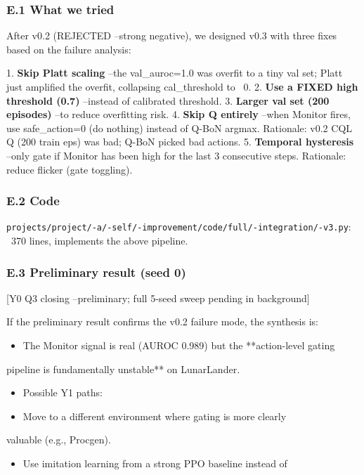 \documentclass[11pt]{article}
\begin{document}
\subsubsection{E.1 What we tried}

After v0.2 (REJECTED --strong negative), we designed v0.3 with three fixes
based on the failure analysis:

1. \textbf{Skip Platt scaling} --the val\_auroc=1.0 was overfit to a tiny val set;
   Platt just amplified the overfit, collapsing cal\_threshold to ~0.
2. \textbf{Use a FIXED high threshold (0.7)} --instead of calibrated threshold.
3. \textbf{Larger val set (200 episodes)} --to reduce overfitting risk.
4. \textbf{Skip Q entirely} --when Monitor fires, use safe\_action=0 (do nothing)
   instead of Q-BoN argmax. Rationale: v0.2 CQL Q (200 train eps) was bad;
   Q-BoN picked bad actions.
5. \textbf{Temporal hysteresis} --only gate if Monitor has been high for the
   last 3 consecutive steps. Rationale: reduce flicker (gate toggling).

\subsubsection{E.2 Code}

\texttt{projects/project/-a/-self/-improvement/code/full/-integration/-v3.py}:
~370 lines, implements the above pipeline.

\subsubsection{E.3 Preliminary result (seed 0)}

[Y0 Q3 closing --preliminary; full 5-seed sweep pending in background]

If the preliminary result confirms the v0.2 failure mode, the synthesis is:

\begin{itemize}
  \item The Monitor signal is real (AUROC 0.989) but the **action-level gating
\end{itemize}

  pipeline is fundamentally unstable** on LunarLander.
\begin{itemize}
  \item Possible Y1 paths:
  \item Move to a different environment where gating is more clearly
\end{itemize}

    valuable (e.g., Procgen).
\begin{itemize}
  \item Use imitation learning from a strong PPO baseline instead of
\end{itemize}
\end{document}
